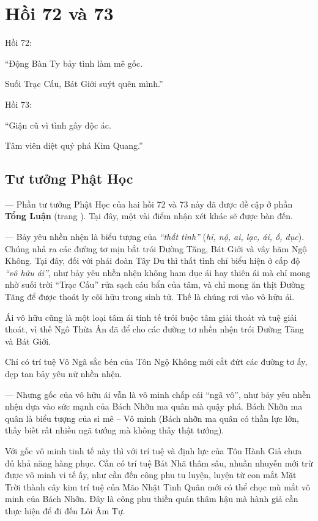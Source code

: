 \chapter{Hồi 72 và 73} %
\label{cha:hoi_72_73}

Hồi 72:

\begin{itshape}
``Động Bàn Ty bảy tình làm mê gốc.

Suối Trạc Cấu, Bát Giới suýt quên mình.''
\end{itshape}

Hồi 73:

\begin{itshape}
``Giận cũ vì tình gây độc ác.

Tâm viên diệt quỷ phá Kim Quang.''
\end{itshape}

\section{Tư tưởng Phật Học} %
\label{sec:72_73_phat_hoc}

— Phần tư tưởng Phật Học của hai hồi 72 và 73 này đã được đề cập ở phần {\bf Tổng Luận} (trang \pageref{sec:bieu_tuong_hoi_54_64_va_72}). Tại đây, một vài điểm nhận xét khác sẽ được bàn đến.

— Bảy yêu nhền nhện là biểu tượng của \emph{``thất tình''} (\emph{hỉ, nộ, ai, lạc, ái, ố, dục}). Chúng nhả ra các đường tơ mịn bắt trói Đường Tăng, Bát Giới và vây hãm Ngộ Không. Tại đây, đối với phái đoàn Tây Du thì thất tình chỉ biểu hiện ở cấp độ \emph{``vô hữu ái''}, như bảy yêu nhền nhện không ham dục ái hay thiên ái mà chỉ mong nhờ suối trời ``Trạc Cấu'' rửa sạch cáu bẩn của tâm, và chỉ mong ăn thịt Đường Tăng để được thoát ly cõi hữu trong sinh tử. Thế là chúng rơi vào vô hữu ái.

Ái vô hữu cũng là một loại tâm ái tinh tế trói buộc tâm giải thoát và tuệ giải thoát, vì thế Ngô Thừa Ân đã để cho các đường tơ nhền nhện trói Đường Tăng và Bát Giới.

Chỉ có trí tuệ Vô Ngã sắc bén của Tôn Ngộ Không mới cắt đứt các đường tơ ấy, dẹp tan bảy yêu nữ nhền nhện.

— Nhưng gốc của vô hữu ái vẫn là vô minh chấp cái ``ngã vô'', như bảy yêu nhền nhện dựa vào sức mạnh của Bách Nhỡn ma quân mà quậy phá. Bách Nhỡn ma quân là biểu tượng của si mê -- Vô minh (Bách nhỡn ma quân có thần lực lớn, thấy biết rất nhiều ngã tướng mà không thấy thật tướng).

Với gốc vô minh tinh tế này thì với trí tuệ và định lực của Tôn Hành Giả chưa đủ khả năng hàng phục. Cần có trí tuệ Bát Nhã thâm sâu, nhuần nhuyễn mới trừ được vô minh vi tế ấy, như cần đến công phu tu luyện, luyện từ con mắt Mặt Trời thành cây kim trí tuệ của Mão Nhật Tinh Quân mới có thể chọc mù mắt vô minh của Bách Nhỡn. Đây là công phu thiền quán thâm hậu mà hành giả cần thực hiện để đi đến Lôi Âm Tự.

